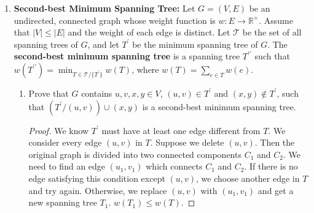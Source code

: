 \documentclass[12pt,a4paper]{article}
\theoremstyle{definition}
\begin{document}
\begin{enumerate}
\begin{enumerate}
    \item For undirected graph, each cross edge $(u,v)$ yields $Dist(v)=Dist(u)$ or $|Dist(v)-Dist(u)|=1$, while for directed graph, each cross edge $(u,v)$ yields $Dist(v)\leq Dist(u)+1$.
    \begin{proof}
    	As we already know, BFS always finds the shortest path in the graph with all edges' length equal to $1$. 
    	
    	In a directed graph, for each cross edge $(u,v)$, if $Dist(v)>Dist(u)+1$, there exists a path $(src\rightarrow u\rightarrow v)$ whose length is $Dist(u)+1$, which contradicts that the shortest length of path between $v$ and source node is $Dist(v)$. So, $Dist(v)\leq Dist(u)+1$.
    	
    	In an undirected graph, for the same reason, we have $Dist(v)\leq Dist(u)+1$. Since $(v,u)$ is also a cross edge, we also have $Dist(v)\leq Dist(u)+1$. Together, $Dist(v)=Dist(u)$ or $Dist(v)=Dist(u)\pm1$.
    \end{proof}
    \end{enumerate}

\item \textbf{Second-best Minimum Spanning Tree:} Let $G=(V,E)$ be an undirected, connected graph whose weight function is $w: E\rightarrow \mathbb{R}^{+}$. Assume that $|V|\leq |E|$ and the weight of each edge is distinct. Let $\mathcal{T}$ be the set of all spanning trees of $G$, and let $T^{\prime}$ be the minimum spanning tree of $G$. The \textbf{second-best minimum spanning tree} is a spanning tree $T^{\prime\prime}$ such that $w(T^{\prime\prime})=\min_{T\in \mathcal{T}\slash\{T^\prime\}} w(T)$, where $w(T)=\sum_{e\in T} w(e)$.

\begin{enumerate}
\item Prove that $G$ contains $u,v,x,y \in V$, $(u,v)\in T^{\prime}$ and $(x,y)\notin T^{\prime}$, such that $(T^{\prime}\slash(u,v))\cup(x,y)$ is a second-best minimum spanning tree.
\begin{proof}
	We know $T^{\prime}$ must have at least one edge different from $T$. We consider every edge $(u,v)$ in $T$. Suppose we delete $(u,v)$. Then the original graph is divided into two connected components $C_1$ and $C_2$. We need to find an edge $(u_1,v_1)$ which connects $C_1$ and $C_2$. If there is no edge satisfying this condition except $(u,v)$, we choose another edge in $T$ and try again. Otherwise, we replace $(u,v)$ with $(u_1,v_1)$ and get a new spanning tree $T_1$. $w(T_1)\leq w(T)$.
	

\end{proof}
\end{enumerate}
\end{enumerate}
\end{document}
